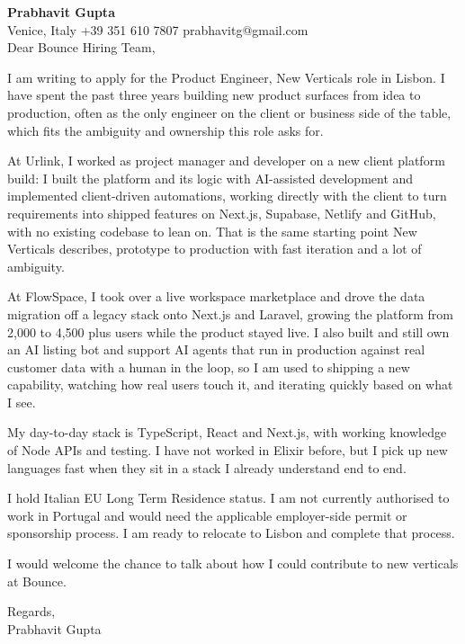 \documentclass[a4paper,10.5pt]{article}
\begin{document}
\textbf{Prabhavit Gupta}\\
Venice, Italy \textbar{} +39 351 610 7807 \textbar{} prabhavitg@gmail.com\\[10pt]
Dear Bounce Hiring Team,

I am writing to apply for the Product Engineer, New Verticals role in Lisbon. I have spent the past three years building new product surfaces from idea to production, often as the only engineer on the client or business side of the table, which fits the ambiguity and ownership this role asks for.

At Urlink, I worked as project manager and developer on a new client platform build: I built the platform and its logic with AI-assisted development and implemented client-driven automations, working directly with the client to turn requirements into shipped features on Next.js, Supabase, Netlify and GitHub, with no existing codebase to lean on. That is the same starting point New Verticals describes, prototype to production with fast iteration and a lot of ambiguity.

At FlowSpace, I took over a live workspace marketplace and drove the data migration off a legacy stack onto Next.js and Laravel, growing the platform from 2,000 to 4,500 plus users while the product stayed live. I also built and still own an AI listing bot and support AI agents that run in production against real customer data with a human in the loop, so I am used to shipping a new capability, watching how real users touch it, and iterating quickly based on what I see.

My day-to-day stack is TypeScript, React and Next.js, with working knowledge of Node APIs and testing. I have not worked in Elixir before, but I pick up new languages fast when they sit in a stack I already understand end to end.

I hold Italian EU Long Term Residence status. I am not currently authorised to work in Portugal and would need the applicable employer-side permit or sponsorship process. I am ready to relocate to Lisbon and complete that process.

I would welcome the chance to talk about how I could contribute to new verticals at Bounce.

Regards,\\
Prabhavit Gupta
\end{document}
